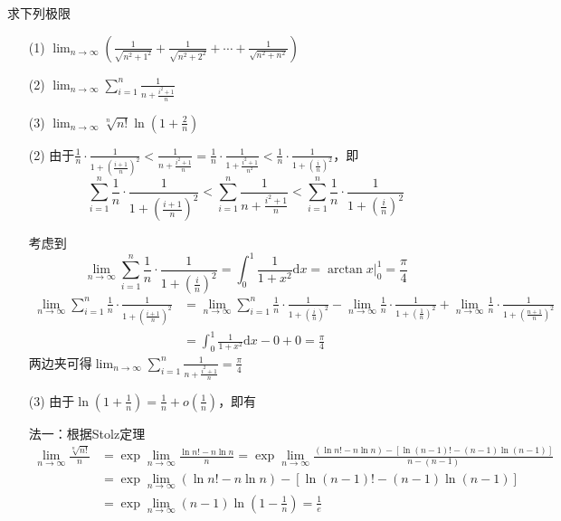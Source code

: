 \begin{xiti}
\begin{solution}
\end{solution}
\item 求下列极限
\begin{enumerate}
	\item[(1)] $\lim _ { n \rightarrow \infty } \left( \frac { 1 } { \sqrt { n ^ { 2 } + 1 ^ { 2 } } } + \frac { 1 } { \sqrt { n ^ { 2 } + 2 ^ { 2 } } } + \cdots + \frac { 1 } { \sqrt { n ^ { 2 } + n ^ { 2 } } } \right)$
	\item[(2)] $\lim _ { n \rightarrow \infty } \sum _ { i = 1 } ^ { n } \frac { 1 } { n + \frac { i ^ { 2 } + 1 } { n } }$
	\item[(3)] $\lim _ { n \rightarrow \infty } \sqrt [ n ] { n ! } \ln \left( 1 + \frac { 2 } { n } \right)$
\end{enumerate}
\begin{solution}
	
	\begin{enumerate}
		\item[(2)] 由于$\frac{1}{n} \cdot \frac{1}{1+\left(\frac{i+1}{n}\right)^{2}}<\frac{1}{n+\frac{i^{2}+1}{n}}=\frac{1}{n} \cdot \frac{1}{1+\frac{i^{2}+1}{n^{2}}}<\frac{1}{n} \cdot \frac{1}{1+\left(\frac{i}{n}\right)^{2}}$，即
		\[\sum_{i=1}^{n} \frac{1}{n} \cdot \frac{1}{1+\left(\frac{i+1}{n}\right)^{2}}<\sum_{i=1}^{n} \frac{1}{n+\frac{i^{2}+1}{n}}<\sum_{i=1}^{n} \frac{1}{n} \cdot \frac{1}{1+\left(\frac{i}{n}\right)^{2}}\]
		
		考虑到
		\[
		\lim _{n \rightarrow \infty} \sum_{i=1}^{n} \frac{1}{n} \cdot \frac{1}{1+\left(\frac{i}{n}\right)^{2}}=\int_{0}^{1} \frac{1}{1+x^{2}} \mathrm{d} x=\arctan \left.x\right|_{0} ^{1}=\frac{\pi}{4}\]
		\begin{align*}
		\lim _{n \rightarrow \infty} \sum_{i=1}^{n} \frac{1}{n} \cdot \frac{1}{1+\left(\frac{i+1}{n}\right)^{2}}&=\lim _{n \rightarrow \infty} \sum_{i=1}^{n} \frac{1}{n} \cdot \frac{1}{1+\left(\frac{i}{n}\right)^{2}}-\lim _{n \rightarrow \infty} \frac{1}{n} \cdot \frac{1}{1+\left(\frac{1}{n}\right)^{2}}+\lim _{n \rightarrow \infty} \frac{1}{n} \cdot \frac{1}{1+\left(\frac{n+1}{n}\right)^{2}}\\
		&=\int_{0}^{1} \frac{1}{1+x^{2}} \mathrm{d} x-0+0=\frac{\pi}{4}
		\end{align*}
		两边夹可得$
		\lim _{n \rightarrow \infty} \sum_{i=1}^{n} \frac{1}{n+\frac{i^{2}+1}{n}}=\frac{\pi}{4}$
		\item[(3)] 由于$\ln(1+\frac{1}{n}) =\frac{1}{n}+o(\frac{1}{n})$，即有
		
		法一：根据Stolz定理
		\begin{equation*}
		\begin{aligned}
		\lim _{n \rightarrow \infty} \frac{\sqrt[n]{n !}}{n}&=\exp\lim _{n \rightarrow \infty}\frac{\ln n!-n\ln n}{n}=\exp{\lim_{n \rightarrow \infty}\frac{(\ln n!-n\ln n)-[\ln(n-1)!-(n-1)\ln(n-1)]}{n-(n-1)}}\\
		&=\exp{\lim_{n \rightarrow \infty}{(\ln n!-n\ln n)-[\ln(n-1)!-(n-1)\ln(n-1)]}}\\
		&=\exp{\lim_{n \rightarrow \infty}(n-1)\ln(1-\frac{1}{n})}=\frac{1}{e}
		\end{aligned}
		\end{equation*}
		

\end{enumerate}
\end{solution}
\end{xiti}
